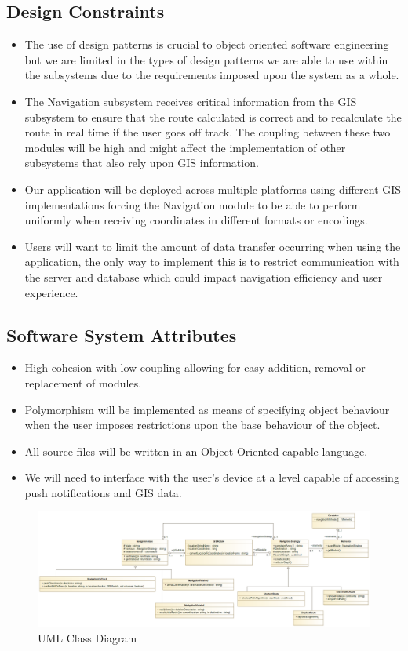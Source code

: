 	\subsection{Design Constraints}
	\begin{itemize}
		\small
		\item The use of design patterns is crucial to object oriented software engineering but we are limited 
			in the types of design patterns we are able to use within the subsystems due to the requirements 
			imposed upon the system as a whole.
		\item The Navigation subsystem receives critical information from the GIS subsystem to ensure that the route
			calculated is correct and to recalculate the route in real time if the user goes off track. The coupling between these two modules will be high and might affect the implementation of other subsystems that also rely upon GIS information.
		\item Our application will be deployed across multiple platforms using different GIS implementations forcing the Navigation module to be able to perform uniformly when receiving coordinates in different formats or encodings.
		\item Users will want to limit the amount of data transfer occurring when using the application, the only way to implement this is to restrict communication with the server and database which could impact navigation efficiency and user experience.
	\end{itemize}
	
	\subsection{Software System Attributes}
	\begin{itemize}
		\small 
		\item High cohesion with low coupling allowing for easy addition, removal or replacement of modules.
		\item Polymorphism will be implemented as means of specifying object behaviour when the user imposes restrictions upon the base behaviour of the object.
		\item All source files will be written in an Object Oriented capable language.
		\item We will need to interface with the user's device at a level capable of accessing push notifications and 
		 GIS data.
	\end{itemize}
	
	\begin{figure}
	  \includegraphics[width=\linewidth]{NavigationModuleClassDiagram.png}
	  \caption{UML Class Diagram}
	  \label{fig:UML1}
	\end{figure}
	
